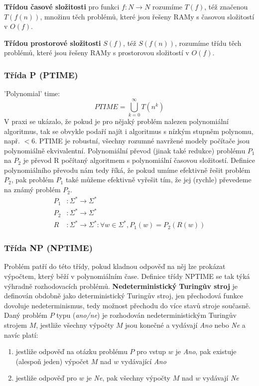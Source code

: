 \textbf{Třídou časové složitosti} pro funkci $f : N \rightarrow N$ rozumíme  $T(f)$, též značenou $T(f(n))$, množinu těch problémů, které jsou řešeny RAMy s časovou složitostí v $O(f)$.

\textbf{Třídou prostorové složitosti} $S(f)$, též $S(f(n))$, rozumíme třídu těch problémů, které jsou řešeny RAMy s prostorovou složitostí v $O(f)$.


\subsubsection{Třída P (PTIME)}
'Polynomial' time:
\begin{equation}
\textit{PTIME} = \bigcup_{k=0}^{\infty}T(n^k)
\end{equation}
V praxi se ukázalo, že pokud je pro nějaký problém nalezen polynomiální algoritmus, tak se obvykle podaří najít i algoritmus s nízkým stupněm polynomu,
např. $<6$. PTIME je robustní, všechny rozumné navržené modely počítače jsou polynomiálně ekvivalentní. Polynomiální převod (jinak také redukce) problému $P_1$ na $P_2$ je převod R počítaný algoritmem s polynomiální časovou složitostí. Definice polynomiálního převodu nám tedy říká, že pokud umíme efektivně řešit problém $P_2$, pak  problém $P_1$  také  můžeme  efektivně  vyřešit  tím,  že  jej  (rychle)  převedeme  na  známý problém $P_2$. 
\begin{equation}
\begin{aligned}
P_1 &: \Sigma^* \rightarrow \Sigma^* \\
P_2 &: \Sigma^* \rightarrow \Sigma^* \\
R &: \Sigma^* \rightarrow \Sigma^* : \forall w \in \Sigma^*, P_1(w) = P_2\left(R\left(w\right)\right)
\end{aligned}
\end{equation}


\subsubsection{Třída NP (NPTIME)} 
Problém patří do této třídy, pokud kladnou odpověď na něj lze prokázat výpočtem, který běží v polynomiálním čase. Definice  třídy NPTIME  se tak  týká  výhradně  rozhodovacích  problémů.
\textbf{Nedeterministický Turingův stroj} je definován obdobně jako deterministický Turingův stroj, jen přechodová funkce dovoluje nedeterminismus, tedy možnost přechodu do více stavů stroje současně. Daný problém $P$ typu (\textit{ano/ne}) je rozhodován nedeterministickým Turingův strojem $M$, jestliže všechny výpočty $M$ jsou konečné a vydávají \textit{Ano} nebo \textit{Ne} a navíc platí:
\begin{enumerate}
\item jestliže  odpověď  na  otázku  problému $P$ pro  vstup $w$  je  \textit{Ano},  pak  existuje  (alespoň jeden) výpočet $M$ nad $w$ vydávající \textit{Ano}
\item jestliže odpověď pro $w$ je \textit{Ne}, pak všechny výpočty $M$ nad $w$ vydávají \textit{Ne}
\end{enumerate}

